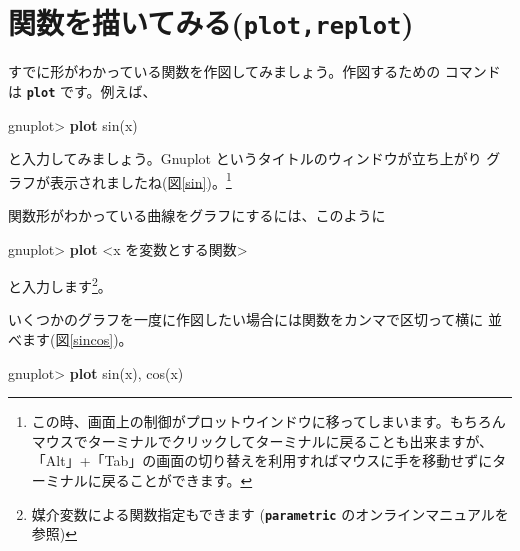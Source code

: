 \documentclass[a4j]{ujarticle} %
\newenvironment{terminal}{%
  \begin{center}
   \begin{minipage}{.8\textwidth}
    \setlength{\FrameSep}{.5\FrameSep}%
    \begin{framed}\ttfamily\small%
     \setlength\baselineskip{.85\baselineskip}%
}{%
    \end{framed}
   \end{minipage}
  \end{center}%
}
\begin{document}
\section{関数を描いてみる({\tt\bf plot,replot})}
すでに形がわかっている関数を作図してみましょう。作図するための
コマンドは {\tt\bf plot} です。例えば、
\begin{terminal}
gnuplot> {\bf plot} sin(x)
\end{terminal}
と入力してみましょう。Gnuplot というタイトルのウィンドウが立ち上がり
グラフが表示されましたね(図\ref{sin})。\footnote{この時、画面上の制御がプロットウインドウに移ってしまいます。もちろんマウスでターミナルでクリックしてターミナルに戻ることも出来ますが、「Alt」+「Tab」の画面の切り替えを利用すればマウスに手を移動せずにターミナルに戻ることができます。}

関数形がわかっている曲線をグラフにするには、このように
\begin{terminal}
 gnuplot> {\bf plot} <x を変数とする関数>
\end{terminal}
と入力します\footnote{媒介変数による関数指定もできます
({\tt\bf parametric} のオンラインマニュアルを参照)}。

いくつかのグラフを一度に作図したい場合には関数をカンマで区切って横に
並べます(図\ref{sincos})。
\begin{terminal}
gnuplot> {\bf plot} sin(x), cos(x)
\end{terminal}
\end{document}
